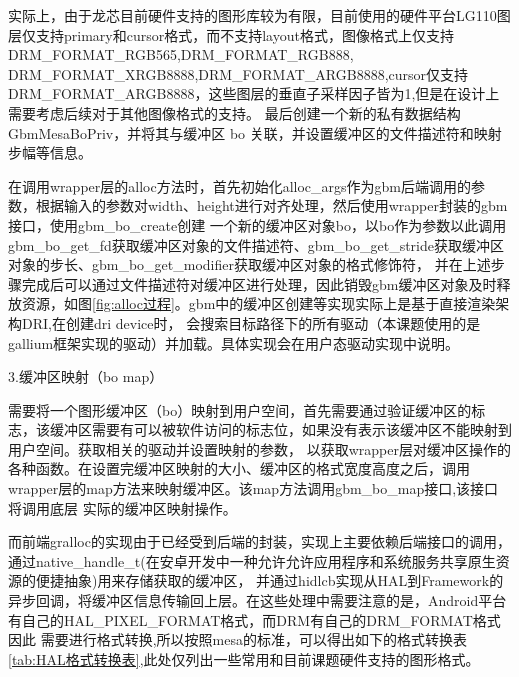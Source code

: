 实际上，由于龙芯目前硬件支持的图形库较为有限，目前使用的硬件平台LG110图层仅支持primary和cursor格式，而不支持layout格式，图像格式上仅支持DRM\_FORMAT\_RGB565,DRM\_FORMAT\_RGB888,
DRM\_FORMAT\_XRGB8888,DRM\_FORMAT\_ARGB8888,cursor仅支持DRM\_FORMAT\_ARGB8888，这些图层的垂直子采样因子皆为1,但是在设计上需要考虑后续对于其他图像格式的支持。
最后创建一个新的私有数据结构 GbmMesaBoPriv，并将其与缓冲区 bo 关联，并设置缓冲区的文件描述符和映射步幅等信息。

在调用wrapper层的alloc方法时，首先初始化alloc\_args作为gbm后端调用的参数，根据输入的参数对width、height进行对齐处理，然后使用wrapper封装的gbm接口，使用gbm\_bo\_create创建
一个新的缓冲区对象bo，以bo作为参数以此调用gbm\_bo\_get\_fd获取缓冲区对象的文件描述符、gbm\_bo\_get\_stride获取缓冲区对象的步长、gbm\_bo\_get\_modifier获取缓冲区对象的格式修饰符，
并在上述步骤完成后可以通过文件描述符对缓冲区进行处理，因此销毁gbm缓冲区对象及时释放资源，如图\ref{fig:alloc过程}。gbm中的缓冲区创建等实现实际上是基于直接渲染架构DRI,在创建dri device时，
会搜索目标路径下的所有驱动（本课题使用的是gallium框架实现的驱动）并加载。具体实现会在用户态驱动实现中说明。



3.缓冲区映射（bo map）

需要将一个图形缓冲区（bo）映射到用户空间，首先需要通过验证缓冲区的标志，该缓冲区需要有可以被软件访问的标志位，如果没有表示该缓冲区不能映射到用户空间。获取相关的驱动并设置映射的参数，
以获取wrapper层对缓冲区操作的各种函数。在设置完缓冲区映射的大小、缓冲区的格式宽度高度之后，调用wrapper层的map方法来映射缓冲区。该map方法调用gbm\_bo\_map接口,该接口将调用底层
实际的缓冲区映射操作。

而前端gralloc的实现由于已经受到后端的封装，实现上主要依赖后端接口的调用，通过native\_handle\_t(在安卓开发中一种允许允许应用程序和系统服务共享原生资源的便捷抽象)用来存储获取的缓冲区，
并通过hidlcb实现从HAL到Framework的异步回调，将缓冲区信息传输回上层。在这些处理中需要注意的是，Android平台有自己的HAL\_PIXEL\_FORMAT格式，而DRM有自己的DRM\_FORMAT格式因此
需要进行格式转换,所以按照mesa的标准，可以得出如下的格式转换表\ref{tab:HAL格式转换表},此处仅列出一些常用和目前课题硬件支持的图形格式。

